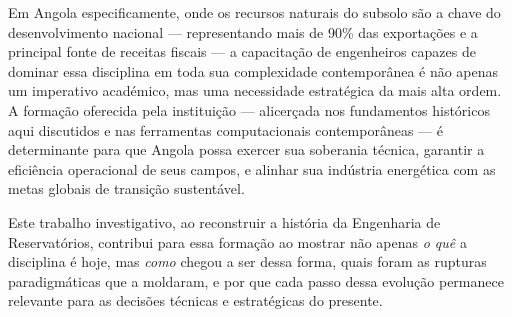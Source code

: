 \documentclass[
  12pt,
  a4paper,
  oneside,
  brazilian,
  sumario=tradicional
]{abntex2}
\begin{document}
Em Angola especificamente, onde os recursos naturais do subsolo são a
chave do desenvolvimento nacional — representando mais de 90\% das
exportações e a principal fonte de receitas fiscais — a capacitação de
engenheiros capazes de dominar essa disciplina em toda sua complexidade
contemporânea é não apenas um imperativo académico, mas uma necessidade
estratégica da mais alta ordem. A formação oferecida pela instituição
— alicerçada nos fundamentos históricos aqui discutidos e nas
ferramentas computacionais contemporâneas — é determinante para que
Angola possa exercer sua soberania técnica, garantir a eficiência
operacional de seus campos, e alinhar sua indústria energética com
as metas globais de transição sustentável.

Este trabalho investigativo, ao reconstruir a história da Engenharia de
Reservatórios, contribui para essa formação ao mostrar não apenas \textit{o quê}
a disciplina é hoje, mas \textit{como} chegou a ser dessa forma, quais
foram as rupturas paradigmáticas que a moldaram, e por que cada passo
dessa evolução permanece relevante para as decisões técnicas e
estratégicas do presente.

\postextual


\end{document}
